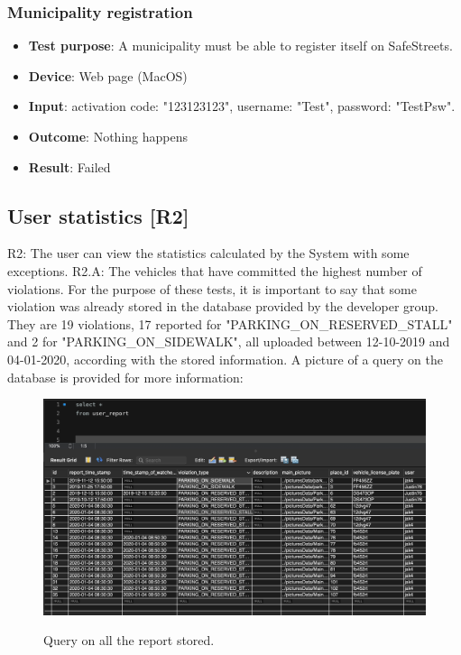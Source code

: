 \documentclass[../ATD.tex]{subfiles}
\begin{document}
    \subsubsection{Municipality registration}\label{subsubsec:municipality-registration}
    \begin{itemize}
        \item \textbf{Test purpose}: A municipality must be able to register itself on SafeStreets.
        \item \textbf{Device}: Web page (MacOS)
        \item \textbf{Input}: activation code: "123123123", username: "Test", password: "TestPsw".
        \item \textbf{Outcome}: Nothing happens
        \item \textbf{Result}: Failed
    \end{itemize}

    \subsection{User statistics [R2]}\label{subsec:user-statistics}
    R2: The user can view the statistics calculated by the System with some exceptions.
    \newline
    R2.A: The vehicles that have committed the highest number of violations.
    \newline
    For the purpose of these tests, it is important to say that some violation was already stored in the database provided by the developer group.
    They are 19 violations, 17 reported for "PARKING\_ON\_RESERVED\_STALL" and 2 for "PARKING\_ON\_SIDEWALK", all uploaded between 12-10-2019 and 04-01-2020, according with the stored information.
    A picture of a query on the database is provided for more information:

    \begin{figure}[H]
        \centering
        \includegraphics[scale = 0.5]{assets/database_user_report.png}\\
        \caption[Query on all the report stored]{Query on all the report stored.}
    \end{figure}
\end{document}
